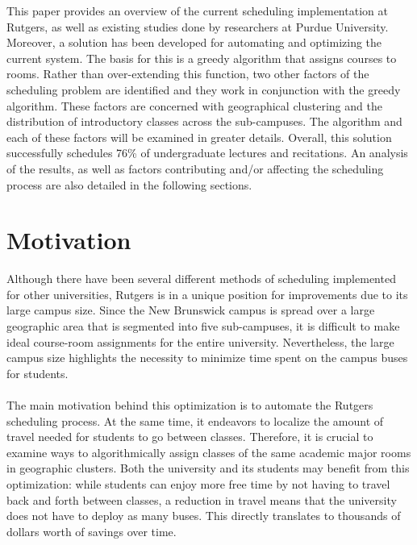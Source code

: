 \documentclass[12pt]{article}
\begin{document}
	This paper provides an overview of the current scheduling implementation at
	Rutgers, as well as existing studies done by researchers at Purdue University.
	Moreover, a solution has been developed for automating and optimizing the
	current system. The basis for this is a greedy algorithm that assigns courses
	to rooms. Rather than over-extending this function, two other factors of the
	scheduling problem are identified and they work in conjunction with the greedy
	algorithm. These factors are concerned with geographical clustering and the
	distribution of introductory classes across the sub-campuses. The algorithm and
	each of these factors will be examined in greater details. Overall, this
	solution successfully schedules 76\% of undergraduate lectures and recitations.
	An analysis of the results, as well as factors contributing and/or affecting
	the scheduling process are also detailed in the following sections.

\section{Motivation}
	Although there have been several different methods of scheduling implemented
	for other universities, Rutgers is in a unique position for improvements due to
	its large campus size. Since the New Brunswick campus is spread over a large
	geographic area that is segmented into five sub-campuses, it is difficult to
	make ideal course-room assignments for the entire university. Nevertheless,
	the large campus size highlights the necessity to minimize time spent on the
	campus buses for students. 
	\\\\
	The main motivation behind this optimization is to automate the Rutgers
	scheduling process. At the same time, it endeavors to localize the amount of
	travel needed for students to go between classes. Therefore, it is crucial to
	examine ways to algorithmically assign classes of the same academic major rooms
	in geographic clusters. Both the university and its students may benefit from
	this optimization: while students can enjoy more free time by not having to
	travel back and forth between classes, a reduction in travel means that the
	university does not have to deploy as many buses. This directly translates to
	thousands of dollars worth of savings over time. 
\end{document}
